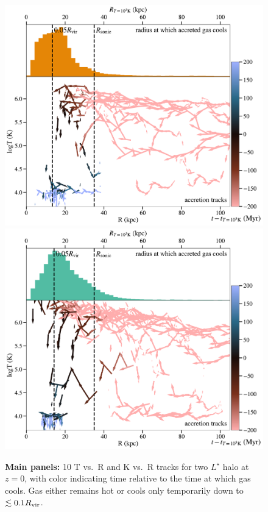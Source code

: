 \documentclass[fleqn,usenatbib]{mnras}
\begin{document}
\begin{figure}
    \centering
    \includegraphics[width=\columnwidth]{figures/tracks_m12i_md.pdf}
    \includegraphics[width=\columnwidth]{figures/tracks_m12b_md.pdf}
    \caption{
    \textbf{Main panels:} 10 T vs.\ R and K vs.\ R tracks for two $L^\star$ halo at $z=0$, with color indicating time relative to the time at which gas cools.
    Gas either remains hot or cools only temporarily down to $\lesssim 0.1 R_{\rm vir}$. 
}
\end{figure}
\end{document}
